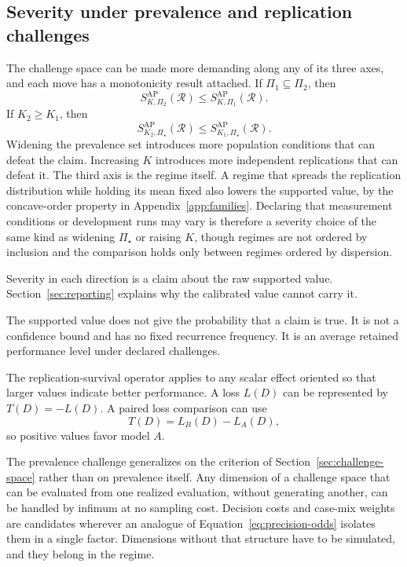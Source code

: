\documentclass[11pt]{article}
\newcommand{\Regime}{\mathcal{R}}
\newcommand{\PSet}{\Pi_\star}
\theoremstyle{remark}
\begin{document}
\subsection{Severity under prevalence and replication challenges}

The challenge space can be made more demanding along any of its three axes, and each move has a monotonicity result attached. If $\Pi_1\subseteq\Pi_2$, then
\begin{equation}
S_{K,\Pi_2}^{\mathrm{AP}}(\Regime)
\leq
S_{K,\Pi_1}^{\mathrm{AP}}(\Regime).
\label{eq:set-monotonicity}
\end{equation}
If $K_2\geq K_1$, then
\begin{equation}
S_{K_2,\PSet}^{\mathrm{AP}}(\Regime)
\leq
S_{K_1,\PSet}^{\mathrm{AP}}(\Regime).
\label{eq:k-monotonicity}
\end{equation}
Widening the prevalence set introduces more population conditions that can defeat the claim. Increasing $K$ introduces more independent replications that can defeat it. The third axis is the regime itself. A regime that spreads the replication distribution while holding its mean fixed also lowers the supported value, by the concave-order property in Appendix~\ref{app:families}. Declaring that measurement conditions or development runs may vary is therefore a severity choice of the same kind as widening $\PSet$ or raising $K$, though regimes are not ordered by inclusion and the comparison holds only between regimes ordered by dispersion.

Severity in each direction is a claim about the raw supported value. Section~\ref{sec:reporting} explains why the calibrated value cannot carry it.

The supported value does not give the probability that a claim is true. It is not a confidence bound and has no fixed recurrence frequency. It is an average retained performance level under declared challenges.

The replication-survival operator applies to any scalar effect oriented so that larger values indicate better performance. A loss $L(D)$ can be represented by $T(D)=-L(D)$. A paired loss comparison can use
\[
T(D)=L_B(D)-L_A(D),
\]
so positive values favor model $A$.

The prevalence challenge generalizes on the criterion of Section~\ref{sec:challenge-space} rather than on prevalence itself. Any dimension of a challenge space that can be evaluated from one realized evaluation, without generating another, can be handled by infimum at no sampling cost. Decision costs and case-mix weights are candidates wherever an analogue of Equation~\eqref{eq:precision-odds} isolates them in a single factor. Dimensions without that structure have to be simulated, and they belong in the regime.
\end{document}
